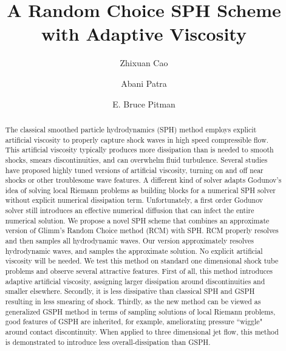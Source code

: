 \documentclass[review]{elsarticle}
\begin{document}
\begin{frontmatter}
\title{A Random Choice SPH Scheme with Adaptive Viscosity}
\author{Zhixuan Cao}
\author{Abani Patra }
\address{Department of Mechanical and Aerospace Engineering, The State University of New York at Buffalo, Amherst, NY, 14260-4200, USA}
\author{E. Bruce Pitman}
\address{Department of Materials Design and Innovation, The State University of New York at Buffalo, Amherst, NY, 14260-4200, USA}

\begin{abstract}
The classical smoothed particle hydrodynamics (SPH) method employs explicit artificial viscosity to properly capture shock waves in high speed compressible flow. This artificial viscosity typically produces more dissipation than is needed to smooth shocks, smears discontinuities, and can overwhelm fluid turbulence. 
Several studies have proposed highly tuned versions of artificial viscosity, turning on and off near shocks or other troublesome wave features.
A different kind of solver adapts Godunov\rq{}s idea of solving local Riemann problems as building blocks for a numerical SPH solver without explicit numerical dissipation term. Unfortunately, a first order Godunov solver still introduces an effective numerical diffusion that can infect the entire numerical solution.
We propose a novel SPH scheme that combines an approximate version of Glimm\rq{}s Random Choice method (RCM) with SPH. RCM properly resolves and then samples all hydrodynamic waves. Our version approximately resolves hydrodynamic waves, and samples the approximate solution. No explicit artificial viscosity will be needed.
We test this method on standard one dimensional shock tube problems and observe several attractive features. First of all, this method introduces adaptive artificial viscosity, assigning larger dissipation around discontinuities and smaller elsewhere. Secondly, it is less dissipative than classical SPH and GSPH resulting in less smearing of shock. Thirdly, as the new method can be viewed as generalized GSPH method in terms of sampling solutions of local Riemann problems, good features of GSPH are inherited, for example, ameliorating pressure ``wiggle" around contact discontinuity.
When applied to three dimensional jet flow, this method is demonstrated to introduce less overall-dissipation than GSPH.


\end{abstract}
\end{frontmatter}
\end{document}
